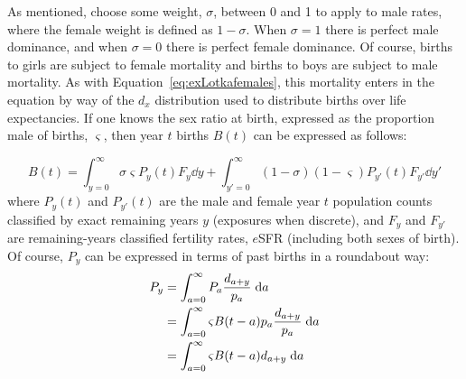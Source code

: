  \FloatBarrier
\label{sec:2sexlinearmain}
As mentioned, choose some weight, $\sigma$, between 0 and 1 to apply to male
rates, where the female weight is defined as $1 - \sigma$. When $\sigma = 1$
there is perfect male dominance, and when $\sigma = 0$ there is perfect female
dominance. Of course, births to girls are subject to female mortality and births
to boys are subject to male mortality. As with
Equation~\eqref{eq:exLotkafemales}, this mortality enters in the equation by way
of the $d_x$ distribution used to distribute births over life expectancies. If
one knows the sex ratio at birth, expressed as the proportion male of births,
$\varsigma$, then year $t$ births $B(t)$ can be expressed as follows:

\begin{equation}
\label{eq:lin2sexBt}
B(t) = \int_{y=0}^\infty \sigma \varsigma P_y(t) F_y \dd y + \int_{y'=0}^\infty
(1-\sigma) (1-\varsigma) P_{y'}(t) F_{y'} \dd y'
\end{equation}
where $P_y(t)$ and $P_{y'}(t)$ are the male and female year $t$ population
counts classified by exact remaining years $y$ (exposures when discrete), and
$F_y$ and $F_{y'}$ are remaining-years classified fertility rates, $e$SFR
(including both sexes of birth). Of course, $P_y$ can be expressed in terms
of past births in a roundabout way:
\begin{align}
\label{eq:rexpressPy}
P_y &= \int_{a=0}^\infty P_a \frac{d_{a+y}}{p_a} \; \mathrm{d} a \notag \\
    &= \int_{a=0}^\infty \varsigma B(t-a)p_a \frac{d_{a+y}}{p_a} \; \mathrm{d} a \notag \\
    &= \int_{a=0}^\infty \varsigma B(t-a)d_{a+y} \; \mathrm{d} a
\end{align}

